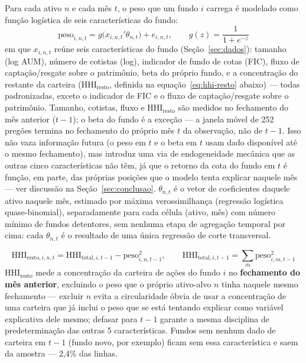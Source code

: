\documentclass[11pt,a4paper]{article}
\begin{document}
Para cada ativo $n$ e cada mês $t$, o peso que um fundo $i$ carrega é modelado como função
logística de seis características do fundo:
\begin{equation}
\text{peso}_{i,n,t} = g\big(x_{i,n,t}'\theta_{n,t}\big) + e_{i,n,t}, \qquad
g(z) = \frac{1}{1+e^{-z}}
\label{eq:cs}
\end{equation}
em que $x_{i,n,t}$ reúne seis características do fundo (Seção~\ref{sec:dados}): tamanho (log
AUM), número de cotistas (log), indicador de fundo de cotas (FIC), fluxo de captação/resgate
sobre o patrimônio, beta do próprio fundo, e a concentração do restante da carteira
($\text{HHI}_{\text{resto}}$, definida na equação~\eqref{eq:hhi-resto} abaixo) --- todas
padronizadas, exceto o indicador de FIC e o fluxo de captação/resgate sobre o patrimônio.
Tamanho, cotistas, fluxo e $\text{HHI}_{\text{resto}}$ são medidos no fechamento do mês anterior
($t-1$); o beta do fundo é a exceção --- a janela móvel de 252 pregões termina no fechamento do
próprio mês $t$ da observação, não de $t-1$. Isso não vaza informação futura (o peso em $t$ e o
beta em $t$ usam dado disponível até o mesmo fechamento), mas introduz uma via de endogeneidade
mecânica que as outras cinco características não têm, já que o retorno da cota do fundo em $t$
é função, em parte, das próprias posições que o modelo tenta explicar naquele mês --- ver
discussão na Seção~\ref{sec:conclusao}. $\theta_{n,t}$ é o vetor de coeficientes daquele ativo naquele mês,
estimado por máxima verossimilhança (regressão logística quase-binomial), separadamente para
cada célula (ativo, mês) com número mínimo de fundos detentores, sem nenhuma etapa de agregação
temporal por cima: cada $\theta_{n,t}$ é o resultado de uma única regressão de corte
transversal.

\begin{equation}
\text{HHI}_{\text{resto},i,n,t} = \text{HHI}_{\text{total},i,t-1} - \text{peso}_{i,n,t-1}^2,
\qquad \text{HHI}_{\text{total},i,t-1} = \sum_{m} \text{peso}_{i,m,t-1}^2
\label{eq:hhi-resto}
\end{equation}
$\text{HHI}_{\text{resto}}$ mede a concentração da carteira de ações do fundo $i$ no
\textbf{fechamento do mês anterior}, excluindo o peso que o próprio ativo-alvo $n$ tinha
naquele mesmo fechamento --- excluir $n$ evita a circularidade óbvia de usar a concentração de
uma carteira que já inclui o peso que se está tentando explicar como variável explicativa dele
mesmo; defasar para $t-1$ garante a mesma disciplina de predeterminação das outras 5
características. Fundos sem nenhum dado de carteira em $t-1$ (fundo novo, por exemplo) ficam
sem essa característica e saem da amostra --- 2,4\% das linhas.
\end{document}
